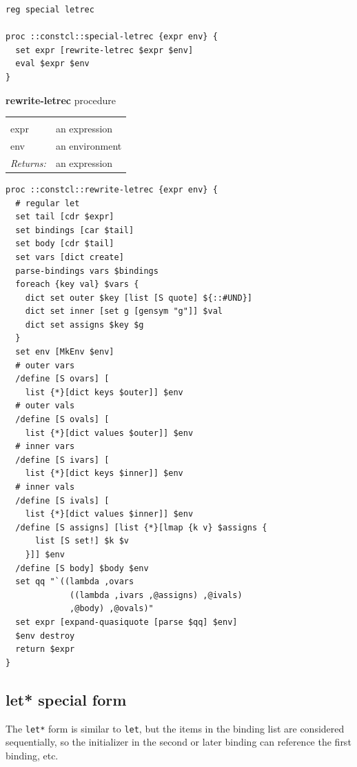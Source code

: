 \documentclass[twoside]{report}
\begin{document}
\begin{lstlisting}
reg special letrec

proc ::constcl::special-letrec {expr env} {
  set expr [rewrite-letrec $expr $env]
  eval $expr $env
}
\end{lstlisting}

\textbf{rewrite-letrec} procedure

\noindent\begin{tabular}{ |p{1.9cm} p{8cm}| }
\hline
\rowcolor[HTML]{CCCCCC} \multicolumn{2}{|l|}{\bf rewrite-letrec (internal)} \\
expr & an expression \\
env & an environment \\
\textit{Returns:} & an expression \\
\hline
\end{tabular}

\begin{lstlisting}
proc ::constcl::rewrite-letrec {expr env} {
  # regular let
  set tail [cdr $expr]
  set bindings [car $tail]
  set body [cdr $tail]
  set vars [dict create]
  parse-bindings vars $bindings
  foreach {key val} $vars {
    dict set outer $key [list [S quote] ${::#UND}]
    dict set inner [set g [gensym "g"]] $val
    dict set assigns $key $g
  }
  set env [MkEnv $env]
  # outer vars
  /define [S ovars] [
    list {*}[dict keys $outer]] $env
  # outer vals
  /define [S ovals] [
    list {*}[dict values $outer]] $env
  # inner vars
  /define [S ivars] [
    list {*}[dict keys $inner]] $env
  # inner vals
  /define [S ivals] [
    list {*}[dict values $inner]] $env
  /define [S assigns] [list {*}[lmap {k v} $assigns {
      list [S set!] $k $v
    }]] $env
  /define [S body] $body $env
  set qq "`((lambda ,ovars
             ((lambda ,ivars ,@assigns) ,@ivals)
             ,@body) ,@ovals)"
  set expr [expand-quasiquote [parse $qq] $env]
  $env destroy
  return $expr
}
\end{lstlisting}

\subsection{let* special form}
\label{let-special-form1}

The \texttt{let*} form is similar to \texttt{let}, but the items in the binding list are considered sequentially, so the initializer in the second or later binding can reference the first binding, etc.
\end{document}
